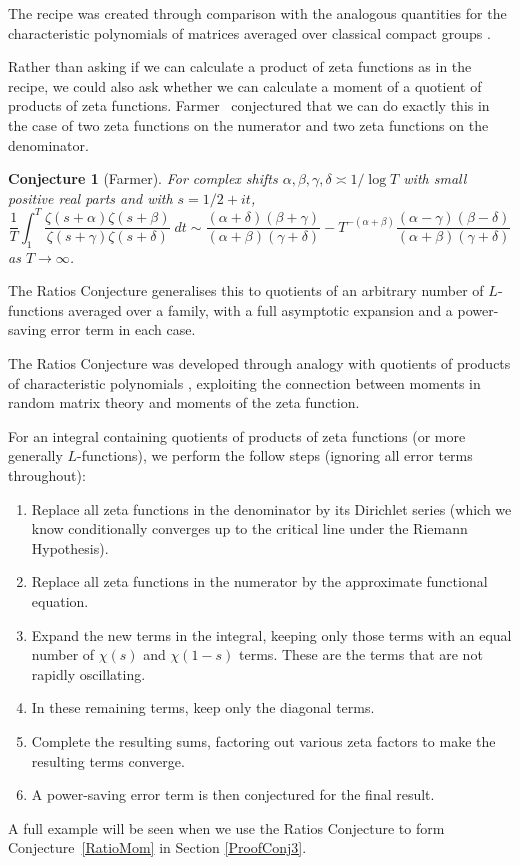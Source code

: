 \documentclass[12pt,a4paper,reqno]{amsart}
\newtheorem{conjecture}{Conjecture}
\theoremstyle{remark}
\numberwithin{equation}{section}
\begin{document}
The recipe was created through comparison with the analogous quantities for the characteristic polynomials of matrices averaged over classical compact groups \cite{CFKRS03}.

Rather than asking if we can calculate a product of zeta functions as in the recipe, we could also ask whether we can calculate a moment of a quotient of products of zeta functions. Farmer~\cite{Far93} conjectured that we can do exactly this in the case of two zeta functions on the numerator and two zeta functions on the denominator.
\begin{conjecture}[Farmer]
For complex shifts $\alpha, \beta, \gamma, \delta \asymp 1/\log T$ with small positive real parts and with $s=1/2+it$,
\[
\frac{1}{T} \int_{1}^{T} \frac{\zeta ( s + \alpha) \zeta ( s + \beta)}{\zeta ( s + \gamma) \zeta ( s + \delta)} \ dt \sim \frac{(\alpha + \delta)(\beta + \gamma)}{(\alpha + \beta)(\gamma + \delta)} - T^{-(\alpha + \beta)} \frac{(\alpha - \gamma)(\beta - \delta)}{(\alpha + \beta)(\gamma + \delta)}
\]
as $T \rightarrow \infty$.
\end{conjecture}
The Ratios Conjecture \cite{CFZ05} generalises this to quotients of an arbitrary number of $L$-functions averaged over a family, with a full asymptotic expansion and a power-saving error term in each case. 

The Ratios Conjecture was developed through analogy with quotients of products of characteristic polynomials \cite{CFZ07}, exploiting the connection between moments in random matrix theory and moments of the zeta function.

For an integral containing quotients of products of zeta functions (or more generally $L$-functions), we perform the follow steps (ignoring all error terms throughout):
\begin{enumerate}
    \item Replace all zeta functions in the denominator by its Dirichlet series (which we know conditionally converges up to the critical line under the Riemann Hypothesis).
    \item Replace all zeta functions in the numerator by the approximate functional equation.
    \item Expand the new terms in the integral, keeping only those terms with an equal number of $\chi (s)$ and $\chi (1-s)$ terms. These are the terms that are not rapidly oscillating.
    \item In these remaining terms, keep only the diagonal terms.
    \item Complete the resulting sums, factoring out various zeta factors to make the resulting terms converge.
    \item A power-saving error term is then conjectured for the final result.
\end{enumerate}
A full example will be seen when we use the Ratios Conjecture to form Conjecture~\ref{RatioMom} in Section \ref{ProofConj3}.
\end{document}
